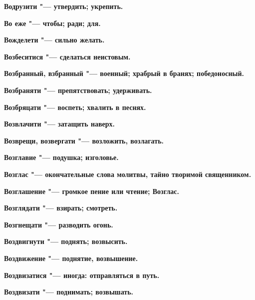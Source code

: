 \begin{mymulticols}{2}
\bfseries Водрузити\normalfont{} "--- утвердить; укрепить. 




\bfseries Во еже\normalfont{} "--- чтобы; ради; для. 




\bfseries Вожделети\normalfont{} "--- сильно желать. 




\bfseries Возбеситися\normalfont{} "--- сделаться неистовым. 




\bfseries Возбранный, взбранный\normalfont{} "--- военный; храбрый в бранях; победоносный. 




\bfseries Возбраняти\normalfont{} "--- препятствовать; удерживать. 




\bfseries Возбряцати\normalfont{} "--- воспеть; хвалить в песнях. 




\bfseries Возвлачити\normalfont{} "--- затащить наверх. 




\bfseries Возврещи, возвергати\normalfont{} "--- возложить, возлагать. 




\bfseries Возглавие\normalfont{} "--- подушка; изголовье. 




\bfseries Возглас\normalfont{} "--- окончательные слова молитвы, тайно творимой священником. 




\bfseries Возглашение\normalfont{} "--- громкое пение или чтение; Возглас. 




\bfseries Возглядати\normalfont{} "--- взирать; смотреть. 




\bfseries Возгнещати\normalfont{} "--- разводить огонь. 




\bfseries Воздвигнути\normalfont{} "--- поднять; возвысить. 




\bfseries Воздвижение\normalfont{} "--- поднятие, возвышение. 




\bfseries Воздвизатися\normalfont{} "--- иногда: отправляться в путь. 




\bfseries Воздвизати\normalfont{} "--- поднимать; возвышать. 





\end{mymulticols}
